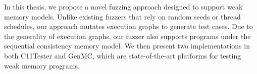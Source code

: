 



In this thesis, we propose a novel fuzzing approach designed to support weak memory models. Unlike existing fuzzers that rely on random seeds or thread schedules, our approach mutates execution graphs to generate test cases. Due to the generality of execution graphs, our fuzzer also supports programs under the sequential consistency memory model. We then present two implementations in both C11Tester and GenMC, which are state-of-the-art platforms for testing weak memory programs.

